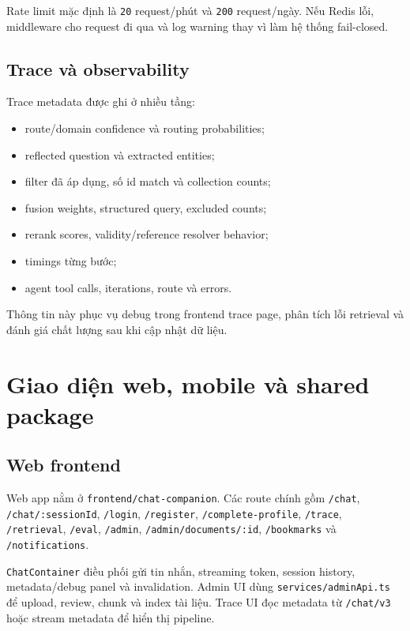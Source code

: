 \documentclass[../DoAn.tex]{subfiles}
\begin{document}
Rate limit mặc định là \texttt{20} request/phút và \texttt{200} request/ngày.
Nếu Redis lỗi, middleware cho request đi qua và log warning thay vì làm hệ thống
fail-closed.

\subsection{Trace và observability}

Trace metadata được ghi ở nhiều tầng:

\begin{itemize}
    \item route/domain confidence và routing probabilities;
    \item reflected question và extracted entities;
    \item filter đã áp dụng, số id match và collection counts;
    \item fusion weights, structured query, excluded counts;
    \item rerank scores, validity/reference resolver behavior;
    \item timings từng bước;
    \item agent tool calls, iterations, route và errors.
\end{itemize}

Thông tin này phục vụ debug trong frontend trace page, phân tích lỗi retrieval và
đánh giá chất lượng sau khi cập nhật dữ liệu.

\section{Giao diện web, mobile và shared package}

\subsection{Web frontend}

Web app nằm ở \texttt{frontend/chat-companion}. Các route chính gồm
\texttt{/chat}, \texttt{/chat/:sessionId}, \texttt{/login}, \texttt{/register},
\texttt{/complete-profile}, \texttt{/trace}, \texttt{/retrieval},
\texttt{/eval}, \texttt{/admin}, \texttt{/admin/documents/:id},
\texttt{/bookmarks} và \texttt{/notifications}.

\texttt{ChatContainer} điều phối gửi tin nhắn, streaming token, session history,
metadata/debug panel và invalidation. Admin UI dùng \texttt{services/adminApi.ts}
để upload, review, chunk và index tài liệu. Trace UI đọc metadata từ
\texttt{/chat/v3} hoặc stream metadata để hiển thị pipeline.
\end{document}
